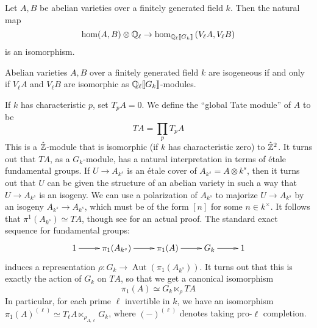 \documentclass{article}
\begin{document}
\begin{theorem}[Faltings]
Let $A,B$ be abelian varieties over a finitely generated field $k$. Then 
the natural map 
\[
  \hom(A,B)\otimes\mathbb{Q}_\ell \to \hom_{\mathbb{Q}_\ell\llbracket G_k\rrbracket}\left(V_\ell A,V_\ell B\right)
\]
is an isomorphism. 
\end{theorem}

\begin{corollary}
Abelian varieties $A,B$ over a finitely generated field $k$ are isogeneous if 
and only if $V_\ell A$ and $V_\ell B$ are isomorphic as 
$\mathbb{Q}_\ell\llbracket G_k\rrbracket$-modules.
\end{corollary}

If $k$ has characteristic $p$, set $T_p A=0$. We define the ``global Tate 
module'' of $A$ to be 
\[
  T A = \prod_p T_p A
\]
This is a $\hat{\mathbb{Z}}$-module that is isomorphic (if $k$ has characteristic 
zero) to $\hat{\mathbb{Z}}^2$. It turns out that $T A$, as a $G_k$-module, has a 
natural interpretation in terms of \'etale fundamental groups. If 
$U\to A_{k^s}$ is an \'etale cover of $A_{k^s}=A\otimes k^s$, then it turns out 
that $U$ can be given the structure of an abelian variety in such a way that 
$U\to A_{k^s}$ is an isogeny. We can use a polarization of $A_{k^s}$ to 
majorize $U\to A_{k^s}$ by an isogeny $A_{k^s}\to A_{k^s}$, which must be of 
the form $[n]$ for some $n\in k^\times$. It follows that 
$\pi^1(A_{k^s}) \simeq T A$, though see \cite[10.37]{gm13} for an actual 
proof. The standard exact sequence for fundamental groups:
\[\xymatrix{
  1 \ar[r] 
    & \pi_1(A_{k^s}) \ar[r] 
    & \pi_1(A) \ar[r] 
    & G_k \ar[r] 
    & 1
}\]
induces a representation 
$\rho:G_k\to \operatorname{Aut}\left(\pi_1(A_{k^s})\right)$. It turns out that 
this is exactly the action of $G_k$ on $T A$, so that we get a canonical 
isomorphism 
\[
  \pi_1(A) \simeq G_k \ltimes_\rho T A
\]
In particular, for each prime $\ell$ invertible in $k$, we have an isomorphism 
$\pi_1(A)^{(\ell)} \simeq T_\ell A\ltimes_{\rho_{A,\ell}} G_k$, where 
$(-)^{(\ell)}$ denotes taking pro-$\ell$ completion. 












\end{document}
